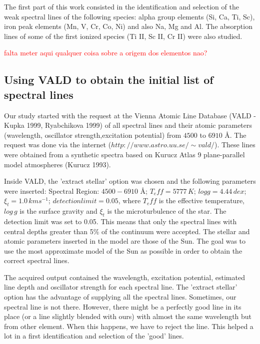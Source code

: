 \documentclass[dvips,12pt,a4paper]{report}
\begin{document}
{The first part of this work consisted in the identification and selection of the weak spectral lines of the following species: alpha group elements (Si, Ca, Ti, Sc), iron peak elements (Mn, V, Cr, Co, Ni) and also Na, Mg and Al. The absorption lines of some of the first ionized species (Ti II, Sc II, Cr II)  were also studied.

\textcolor{red}{falta meter aqui qualquer coisa sobre a origem dos elementos nao?}

\subsection {Using VALD to obtain the initial list of spectral lines}
\label{VALD}
Our study started with the request at the Vienna Atomic Line Database (VALD - Kupka 1999, Ryabchikova 1999)  of all spectral lines and their atomic parameters (wavelength, oscillator strength,excitation potential) %
from $4500$ to $6910$ \AA. The request was done via the internet ($http://www.astro.uu.se/\sim vald/$). These lines were obtained from a synthetic spectra based on Kurucz Atlas 9 plane-parallel model atmospheres (Kurucz 1993).

Inside VALD, the 'extract stellar' option was chosen and the following parameters were inserted: Spectral Region: $4500-6910$ \AA ; $T_eff=5777\, K$; $log g=4.44\,dex$; $\xi_t=1.0\,kms^{-1}$; $detection limit=0.05$, where $T_eff$ is the effective temperature, $log\,g$ is the surface gravity and $\xi_t$ is the microturbulence of the star. The detection limit was set to 0.05. This means that only the spectral lines with central depths greater than 5\% of the continuum were accepted. The stellar and atomic parameters inserted in the model are those of the Sun. The goal was to use the most approximate model of the Sun as possible in order to obtain the correct spectral lines.

The acquired output contained the wavelength, excitation potential, estimated line depth and oscillator strength for each spectral line. The 'extract stellar' option has the advantage of supplying all the spectral lines. Sometimes, our spectral line is not there. However, there might be a perfectly good line in its place (or a line slightly blended with ours) with almost the same wavelength but from other element. When this happens, we have to reject the line. This helped a lot in a first identification and selection of the 'good' lines. 

}
\end{document}
